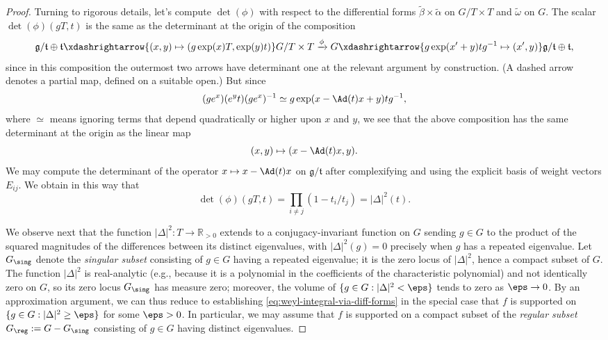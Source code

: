 \documentclass[reqno]{amsart} 
\begin{document}
\begin{proof}
  Turning to rigorous details, let's compute $\det(\phi)$ with respect to the differential forms $\tilde{\beta} \times \tilde{\alpha}$ on $G/T \times T$ and $\tilde{\omega}$ on $G$.  The scalar $\det(\phi)(g T, t)$ is the same as the determinant at the origin of the composition
  \begin{equation*}
    \mathfrak{g}/\mathfrak{t} \oplus \mathfrak{t} \xdashrightarrow{(x,y) \mapsto (g \exp(x) T, \exp(y) t)} G/T \times T \xrightarrow{\phi } G \xdashrightarrow{g \exp(x'+y) t g^{-1} \mapsto (x',y)} \mathfrak{g}/\mathfrak{t} \oplus \mathfrak{t},
  \end{equation*}
  since in this composition the outermost two arrows have determinant one at the relevant argument by construction.  (A dashed arrow denotes a partial map, defined on a suitable open.)  But since
  \begin{equation*}
    (g e^x) (e^y t) (g e^x)^{-1} \simeq g \exp(x - \Ad(t) x + y) t g^{-1},
  \end{equation*}
  where $\simeq$ means ignoring terms that depend quadratically or higher upon $x$ and $y$, we see that the above composition has the same determinant at the origin as the linear map
  \begin{equation*}
    (x,y) \mapsto (x - \Ad(t) x, y).
  \end{equation*}
  We may compute the determinant of the operator $x \mapsto x - \Ad(t) x$ on $\mathfrak{g}/\mathfrak{t}$ after complexifying and using the explicit basis of weight vectors $E_{i j}$.  We obtain in this way that
  \begin{equation}\label{eq:compute-det-phi}
    \det(\phi)(g T, t)
    =
    \prod_{i \neq j}
    (1 - t_i/t_j)
    = |\Delta|^2(t).
  \end{equation}

  We observe next that the function $|\Delta|^2 : T \rightarrow \mathbb{R}_{>0}$ extends to a conjugacy-invariant function on $G$ sending $g \in G$ to the product of the squared magnitudes of the differences between its distinct eigenvalues, with $|\Delta|^2(g) = 0$ precisely when $g$ has a repeated eigenvalue.  Let $G_{\sing}$ denote the \emph{singular subset} consisting of $g \in G$ having a repeated eigenvalue; it is the zero locus of $|\Delta|^2$, hence a compact subset of $G$.  The function $|\Delta|^2$ is real-analytic (e.g., because it is a polynomial in the coefficients of the characteristic polynomial) and not identically zero on $G$, so its zero locus $G_{\sing}$ has measure zero; moreover, the volume of $\{g \in G : |\Delta|^2 < \eps \}$ tends to zero as $\eps \rightarrow 0$.  By an approximation argument, we can thus reduce to establishing \eqref{eq:weyl-integral-via-diff-forms} in the special case that $f$ is supported on $\{g \in G : |\Delta|^2 \geq \eps\}$ for some $\eps > 0$.  In particular, we may assume that $f$ is supported on a compact subset of the \emph{regular subset} $G_{\reg} := G - G_{\sing}$ consisting of $g \in G$ having distinct eigenvalues.


\end{proof}
\end{document}
